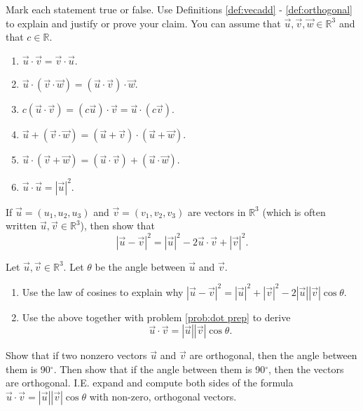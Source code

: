 \begin{problem}\label{dot product facts}
Mark each statement true or false. Use Definitions \ref{def:vecadd} - \ref{def:orthogonal} to explain and justify or prove your claim. You can assume that $\vec u,\vec v,\vec w\in\mathbb{R}^3$ and that $c\in\mathbb{R}$.
\begin{enumerate}
\item $\vec u\cdot \vec v=\vec v\cdot \vec u$. 
\item $\vec u\cdot (\vec v\cdot \vec w)=(\vec u\cdot\vec v)\cdot\vec w$. 
\item $c(\vec u\cdot \vec v)=(c\vec u)\cdot \vec v=\vec u\cdot (c\vec v)$. 
\item $\vec u+(\vec v\cdot \vec w)=(\vec u+\vec v)\cdot(\vec u+\vec w)$. 
\item $\vec u\cdot (\vec v+ \vec w)=(\vec u\cdot \vec v)+(\vec u\cdot\vec w)$. 
\item $\vec u\cdot \vec u= |\vec u|^2$. 
\end{enumerate}
\end{problem}


\begin{problem}\label{prob:dot prep} 
If $\vec u = (u_1,u_2,u_3)$ and $\vec v= (v_1,v_2,v_3)$ are vectors in $\mathbb{R}^3$ (which is often written $\vec u,\vec v\in\mathbb{R}^3$), then show that 
$$|\vec u-\vec v|^2 = |\vec u|^2-2\vec u\cdot \vec v +|\vec v|^2.$$
\end{problem}

\begin{problem}\label{prob:dot angle formula}  
%
Let $\vec u,\vec v\in\mathbb{R}^3$. Let $\theta$ be the angle between $\vec u$ and $\vec v$. 
\begin{enumerate}
\item Use the law of cosines to explain why $|\vec u-\vec v|^2=|\vec u|^2+|\vec v|^2-2|\vec u||\vec v|\cos\theta$.
\item Use the above together with problem \ref{prob:dot prep} to derive $$\vec u\cdot \vec v=|\vec u||\vec v|\cos\theta.$$
\end{enumerate}
\end{problem}

\begin{problem} 
%
Show that if two nonzero vectors $\vec u$ and $\vec v$ are orthogonal, then the angle between them is 90$^\circ$. Then show that if the angle between them is 90$^\circ$, then the vectors are orthogonal. I.E. expand and compute both sides of the formula $\vec u\cdot \vec v=|\vec u||\vec v|\cos\theta$ with non-zero, orthogonal vectors.
\end{problem}

